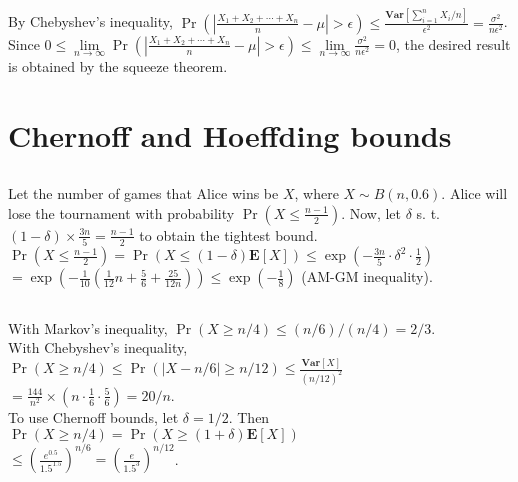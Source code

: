 \documentclass{article}
\begin{document}
\subsection{}
\subsection{}
\subsection{}
By Chebyshev's inequality, $\Pr\left(\left|\frac{X_1+X_2+\cdots+X_n}{n}-\mu\right|>\epsilon\right) \leq \frac{\textbf{Var}[\sum\limits_{i=1}^nX_i/n]}{\epsilon^2}=\frac{\sigma^2}{n\epsilon^2}$.\\
Since $0\leq\lim\limits_{n\rightarrow\infty}\Pr\left(\left|\frac{X_1+X_2+\cdots+X_n}{n}-\mu\right|>\epsilon\right)\leq\lim\limits_{n\rightarrow\infty}\frac{\sigma^2}{n\epsilon^2}=0$, the desired result is obtained by the squeeze theorem.
\newpage
\section{Chernoff and Hoeffding bounds}
\subsection{}
Let the number of games that Alice wins be $X$, where $X\sim B(n,0.6)$. Alice will lose the tournament with probability $\Pr(X\leq \frac{n-1}{2})$.
Now, let $\delta$ s. t. $(1-\delta) \times \frac{3n}{5} = \frac{n-1}{2}$ to obtain the tightest bound.\\
$\Pr(X\leq \frac{n-1}{2})=\Pr(X\leq(1-\delta)\textbf{E}[X])\leq \exp(-\frac{3n}{5}\cdot \delta^2 \cdot \frac{1}{2})$\\
$=\exp(-\frac{1}{10}(\frac{1}{12}n+\frac{5}{6}+\frac{25}{12n}))\leq \exp(-\frac{1}{8})$ (AM-GM inequality).
\subsection{}
With Markov's inequality, $\Pr(X\geq n/4) \leq (n/6)/(n/4)=2/3$.\\
With Chebyshev's inequality, $\Pr(X\geq n/4) \leq \Pr(|X-n/6|\geq n/12)\leq \frac{\textbf{Var}[X]}{(n/12)^2}$\\
$=\frac{144}{n^2}\times(n\cdot \frac{1}{6}\cdot\frac{5}{6})=20/n$.\\
To use Chernoff bounds, let $\delta=1/2$. Then $\Pr(X\geq n/4)=\Pr(X\geq(1+\delta)\textbf{E}[X])$\\
$\leq\left(\frac{e^{0.5}}{1.5^{1.5}}\right)^{n/6}=\left(\frac{e}{1.5^3}\right)^{n/12}$.
\end{document}
